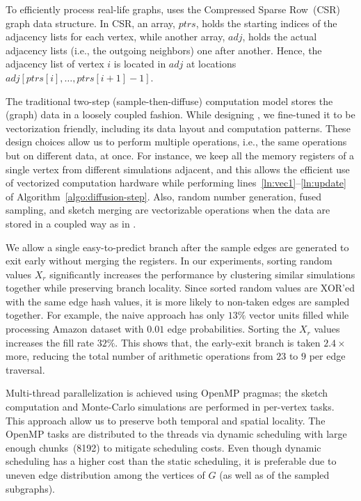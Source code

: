 \documentclass[review]{elsarticle}
\newcommand\acro{{\sc{HyperFuseR\xspace}\xspace}\xspace}
\begin{document}

To efficiently process real-life graphs, \acro uses the Compressed Sparse Row~(CSR) graph data structure. In CSR, an array, $ptrs$, holds the starting indices of the adjacency lists for each vertex, while another array, $adj$, holds the actual adjacency lists (i.e., the outgoing neighbors) one after another. Hence, the adjacency list of vertex $i$ is located in $adj$ at locations $adj[ptrs[i], \ldots, ptrs[i+1] - 1]$. 
    
The traditional two-step (sample-then-diffuse) computation model stores the (graph) data in a loosely coupled fashion.
While designing \acro, we fine-tuned it to be vectorization friendly, including its data layout and computation patterns. These design choices allow us to perform multiple operations, i.e., the same operations but on different data, at once. For instance, we keep all the memory registers of a single vertex from different simulations adjacent, and this allows the efficient use of vectorized computation hardware while performing lines~\ref{ln:vec1}--\ref{ln:update} of Algorithm~\ref{algo:diffusion-step}. Also, random number generation, fused sampling, and sketch merging are vectorizable operations when the data are stored in a coupled way as in \acro.

We allow a single easy-to-predict branch after the sample edges are generated to exit early without merging the registers. In our experiments, sorting random values $X_r$ significantly increases the performance by clustering similar simulations together while preserving branch locality. Since sorted random values are XOR'ed with the same edge hash values, it is more likely to non-taken edges are sampled together. For example, the naive approach has only $13\%$ vector units filled while processing Amazon dataset with $0.01$ edge probabilities. Sorting the $X_r$ values increases the fill rate  $32\%$. This shows that, the early-exit branch is taken $2.4\times$ more, reducing the total number of arithmetic operations from $23$ to $9$ per edge traversal.

Multi-thread parallelization is achieved using OpenMP pragmas; the sketch computation and Monte-Carlo simulations are performed in per-vertex tasks. This approach allow us to preserve both temporal and spatial locality. The OpenMP tasks are distributed to the threads via dynamic scheduling with large enough chunks~(8192) to mitigate scheduling costs. Even though dynamic scheduling has a higher cost than the static scheduling, it is preferable due to uneven edge distribution among the vertices of $G$ (as well as of the sampled subgraphs).  
\end{document}
